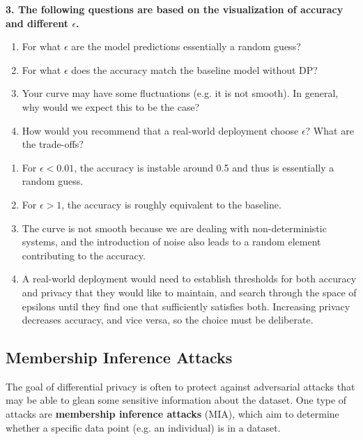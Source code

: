 \documentclass{article}
\begin{document}
\textbf{3. The following questions are based on the visualization of accuracy and different $\epsilon$.}

\begin{enumerate}[label=\Alph*.]
    \item For what $\epsilon$ are the model predictions essentially a random guess?
    \item For what $\epsilon$ does the accuracy match the baseline model without DP?
    \item Your curve may have some fluctuations (e.g. it is not smooth). In general, why would we expect this to be the case?
    \item How would you recommend that a real-world deployment choose $\epsilon$? What are the trade-offs?
\end{enumerate}

\bigskip
\begin{mdframed}
\begin{enumerate}[label=\Alph*.]
    \item For $\epsilon < 0.01$, the accuracy is instable around 0.5 and thus is essentially a random guess.  
    \item For $\epsilon > 1$, the accuracy is roughly equivalent to the baseline.
    \item The curve is not smooth because we are dealing with non-deterministic systems, and the introduction of noise also leads to a random element contributing to the accuracy. 
    \item A real-world deployment would need to establish thresholds for both accuracy and privacy that they would like to maintain, and search through the space of epsilons until they find one that sufficiently satisfies both. Increasing privacy decreases accuracy, and vice versa, so the choice must be deliberate.
\end{enumerate}
\end{mdframed}


\subsection*{Membership Inference Attacks}



The goal of differential privacy is often to protect against adversarial attacks that may be able to glean some sensitive information about the dataset. One type of attacks are \textbf{membership inference attacks} (MIA), which aim to determine whether a specific data point (e.g. an individual) is in a dataset.
\end{document}
